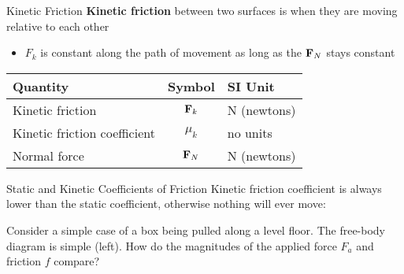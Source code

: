 \documentclass[12pt,compress,aspectratio=169]{beamer}
\newcommand{\mb}[1]{\ensuremath\mathbf{#1}}
\newcommand{\eq}[2]{\vspace{#1}{\Large\begin{displaymath}#2\end{displaymath}}}
\begin{document}
\begin{frame}{Kinetic Friction}
  \textbf{Kinetic friction} between two surfaces is when they are moving
  relative to each other
  \begin{itemize}
  \item $F_k$ is constant along the path of movement as long as the $\mb{F}_N$
    stays constant
  \end{itemize}

  \eq{-.3in}{\boxed{F_k = \mu_kF_N}}
  \begin{center}
    \begin{tabular}{l|c|l}
      \rowcolor{pink}
      \textbf{Quantity} & \textbf{Symbol} & \textbf{SI Unit} \\ \hline
      Kinetic friction  & $\mb{F}_k$ & \si{\newton} (newtons)\\
      Kinetic friction coefficient & $\mu_k$ & no units \\
      Normal force     & $\mb{F}_N$ & \si{\newton} (newtons)
    \end{tabular}
  \end{center}
\end{frame}



\begin{frame}{Static and Kinetic Coefficients of Friction}    
  Kinetic friction coefficient is always lower than the static coefficient,
  otherwise nothing will ever move:
    
  \eq{-.4in}{\mu_k\leq\mu_s}

  Consider a simple case of a box being pulled along a level floor. The
  free-body diagram is simple (left). How do the magnitudes of the applied
  force $F_a$ and friction $f$ compare?
  \begin{columns}
    \begin{center}
    \end{center}

    \begin{center}
    \end{center}
  \end{columns}
\end{frame}
\end{document}
